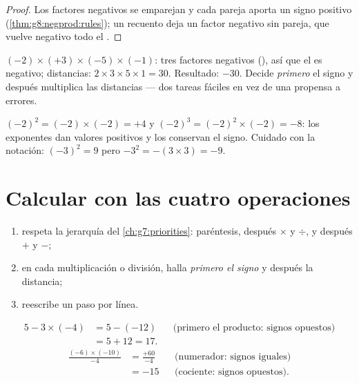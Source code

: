 \begin{proof}
Los factores negativos se emparejan y cada pareja aporta un signo positivo
(\cref{thm:g8:negprod:rules}); un recuento  deja un factor negativo
sin pareja, que vuelve negativo todo el .
\end{proof}

\begin{example}\label{ex:g8:negprod:many}
$(-2) \times (+3) \times (-5) \times (-1)$: tres factores negativos
(), así que el  es negativo; distancias: $2 \times 3 \times 5
\times 1 = 30$. Resultado: $-30$. Decide \emph{primero} el signo y después
multiplica las distancias --- dos tareas fáciles en vez de una propensa
a errores.
\end{example}

\begin{example}\label{ex:g8:negprod:powers}
$(-2)^2 = (-2) \times (-2) = +4$ y
$(-2)^3 = (-2)^2 \times (-2) = -8$: los exponentes  dan valores
positivos y los  conservan el signo. Cuidado con la notación:
$(-3)^2 = 9$ pero $-3^2 = -(3 \times 3) = -9$.
\end{example}

\section{Calcular con las cuatro operaciones}

\begin{method}\label{met:g8:negprod:compute}
\begin{enumerate}
  \item respeta la jerarquía del \cref{ch:g7:priorities}: paréntesis,
        después $\times$ y $\div$, y después $+$ y $-$;
  \item en cada multiplicación o división, halla \emph{primero el
        signo} y después la distancia;
  \item reescribe un paso por línea.
\end{enumerate}
\end{method}

\begin{example}\label{ex:g8:negprod:compute}
\begin{align*}
5 - 3 \times (-4)
&= 5 - (-12) && \text{(primero el producto: signos opuestos)}\\
&= 5 + 12 = 17 .
\end{align*}
\begin{align*}
\frac{(-6) \times (-10)}{-4}
&= \frac{+60}{-4} && \text{(numerador: signos iguales)}\\
&= -15 && \text{(cociente: signos opuestos).}
\end{align*}
\end{example}

